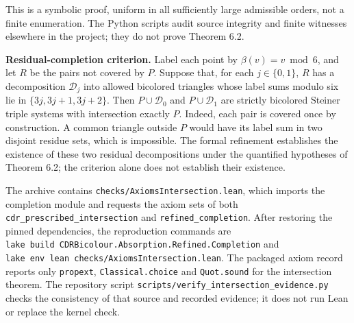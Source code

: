 \documentclass[english,11pt,a4paper]{article}
\begin{document}
This is a symbolic proof, uniform in all sufficiently large admissible orders, not a finite enumeration. The Python scripts audit source integrity and finite witnesses elsewhere in the project; they do not prove Theorem 6.2.

\textbf{Residual-completion criterion.} Label each point by \(\beta(v)=v\bmod6\), and let \(R\) be the pairs not covered by \(P\). Suppose that, for each \(j\in\{0,1\}\), \(R\) has a decomposition \(\mathcal D_j\) into allowed bicolored triangles whose label sums modulo six lie in \(\{3j,3j+1,3j+2\}\). Then \(P\cup\mathcal D_0\) and \(P\cup\mathcal D_1\) are strictly bicolored Steiner triple systems with intersection exactly \(P\). Indeed, each pair is covered once by construction. A common triangle outside \(P\) would have its label sum in two disjoint residue sets, which is impossible. The formal refinement establishes the existence of these two residual decompositions under the quantified hypotheses of Theorem 6.2; the criterion alone does not establish their existence.

The archive contains \texttt{checks/\allowbreak{}Axioms\allowbreak{}Intersection.\allowbreak{}lean}, which imports the completion module and requests the axiom sets of both \texttt{cdr\_\allowbreak{}prescribed\_\allowbreak{}intersection} and \texttt{refined\_\allowbreak{}completion}. After restoring the pinned dependencies, the reproduction commands are \texttt{lake\ build\ CDRBicolour.\allowbreak{}Absorption.\allowbreak{}Refined.\allowbreak{}Completion} and \texttt{lake\ env\ lean\ checks/\allowbreak{}Axioms\allowbreak{}Intersection.\allowbreak{}lean}. The packaged axiom record reports only \texttt{propext}, \texttt{Classical.\allowbreak{}choice} and \texttt{Quot.\allowbreak{}sound} for the intersection theorem. The repository script \texttt{scripts/\allowbreak{}verify\_\allowbreak{}intersection\_\allowbreak{}evidence.\allowbreak{}py} checks the consistency of that source and recorded evidence; it does not run Lean or replace the kernel check.
\end{document}
